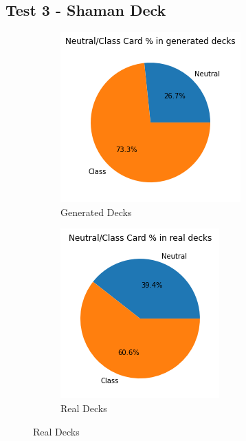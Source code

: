 \documentclass{report} %
\begin{document}
\subsection{Test 3 - Shaman Deck}
\begin{figure}[H]
\centering
\begin{subfigure}{.3\textwidth}
 \centering
 \includegraphics[width=.75\linewidth]{TestImages/NeutralSplitShamanDecksFake}
 \caption{Generated Decks}
\end{subfigure}%
\begin{subfigure}{.3\textwidth}
 \centering
 \includegraphics[width=.75\linewidth]{TestImages/NeutralSplitShamanDecksReal}
 \caption{Real Decks}
\end{subfigure}%

\end{figure}
\end{document}
